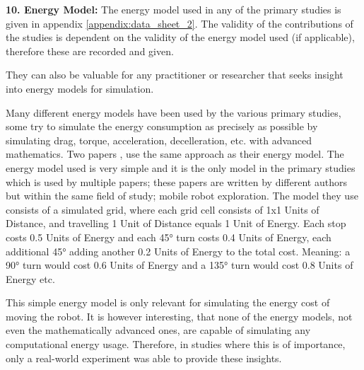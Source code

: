 \vspace{2mm}

\noindent\textbf{10. Energy Model:}
The energy model used in any of the primary studies is given in appendix \ref{appendix:data_sheet_2}.
The validity of the contributions of the studies is dependent on the validity of the energy model used (if applicable), 
therefore these are recorded and given.

\vspace{2mm}

They can also be valuable for any practitioner or researcher that seeks insight into energy models for simulation.

\vspace{2mm}

Many different energy models have been used by the various primary studies, some try to simulate the energy consumption 
as precisely as possible by simulating drag, torque, acceleration, decelleration, etc. with advanced mathematics. 
Two papers \cite{patel2012exploration_strategy, mei2006mobile_exploration}, use the same approach as their energy model.
The energy model used is very simple and it is the only model in the primary studies which is used by multiple papers;
these papers are written by different authors but within the same field of study; mobile robot exploration.
The model they use consists of a simulated grid, where each grid cell consists of 1x1 Units of Distance, 
and travelling 1 Unit of Distance equals 1 Unit of Energy.
Each stop costs 0.5 Units of Energy and each 45° turn costs 0.4 Units of Energy, each additional 45° adding another 
0.2 Units of Energy to the total cost.
Meaning: a 90° turn would cost 0.6 Units of Energy and a 135° turn would cost 0.8 Units of Energy etc.

\vspace{2mm}

This simple energy model is only relevant for simulating the energy cost of moving the robot.
It is however interesting, that none of the energy models, not even the mathematically advanced ones, are capable of 
simulating any computational energy usage.
Therefore, in studies where this is of importance, only a real-world experiment was able to provide these insights.


